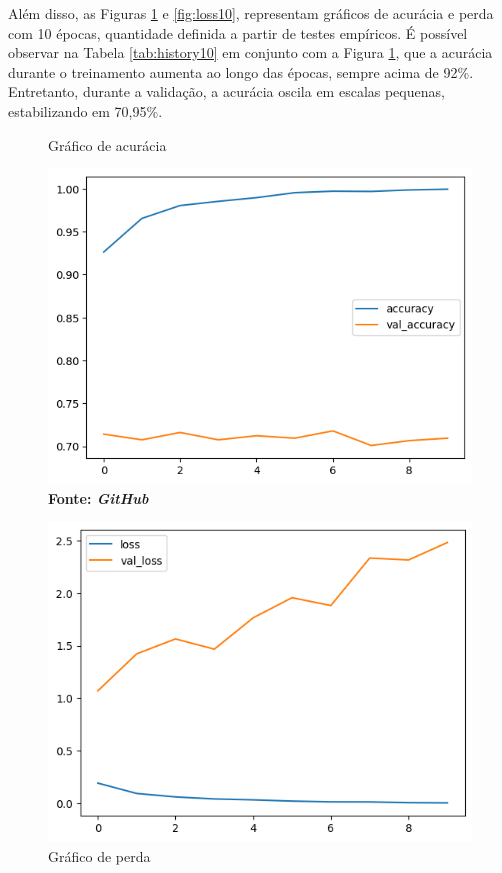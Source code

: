 Além disso, as Figuras \ref{fig:acc10} e \ref{fig:loss10}, representam gráficos de acurácia e perda com 10 épocas, quantidade definida a partir de testes empíricos. É possível observar na Tabela \ref{tab:history10} em conjunto com a Figura \ref{fig:acc10}, que a acurácia durante o treinamento aumenta ao longo das épocas, sempre acima de 92\%. Entretanto, durante a validação, a acurácia oscila em escalas pequenas, estabilizando em 70,95\%. 

\begin{figure}[ht]
\centering
\begin{minipage}{0.45\textwidth}
  \centering
  \caption[\hspace{0.1cm}Grade Computacional.]{Gráfico de acurácia}
  \vspace{-0.4cm}
  \includegraphics[width=\linewidth]{figuras/accuracy_10.png}
  \captionsetup{justification=centering}
  \vspace{-0.2cm}
  \\\textbf{\footnotesize Fonte: \textit{GitHub}}
  \label{fig:acc10}
\end{minipage}\hfill
\begin{minipage}{0.45\textwidth}
  \centering
  \caption[\hspace{0.1cm}Grade Computacional.]{Gráfico de perda}
  \vspace{-0.4cm}
  \includegraphics[width=\linewidth]{figuras/loss_10.png}

\end{minipage}
\end{figure}
